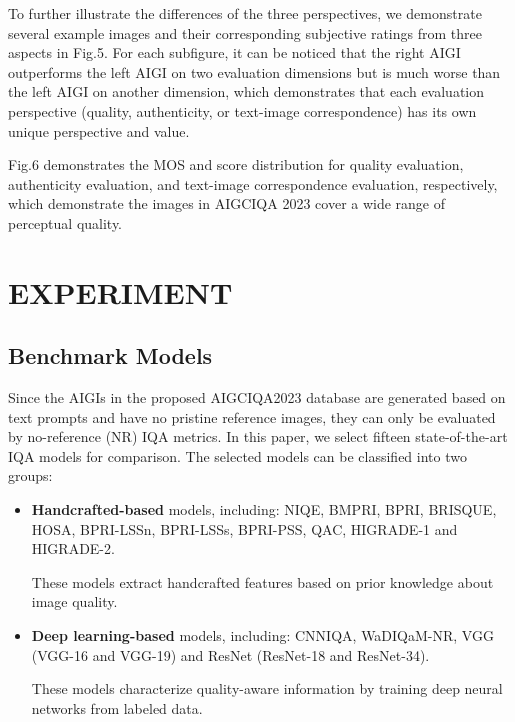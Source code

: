 \documentclass[runningheads]{llncs}
\begin{document}
To further illustrate the differences of the three perspectives, we demonstrate several example images and their corresponding subjective ratings from three aspects in Fig.5.
For each subfigure, it can be noticed that the right AIGI outperforms the left AIGI on two evaluation dimensions but is much worse than the left AIGI on another dimension, which demonstrates that each evaluation perspective (quality, authenticity, or text-image correspondence) has its own unique perspective and value.



Fig.6 demonstrates the MOS and score distribution for quality evaluation, authenticity evaluation, and text-image correspondence evaluation, respectively, which demonstrate the images in AIGCIQA 2023 cover a wide range of perceptual quality. 





\section{EXPERIMENT}
\subsection{Benchmark Models}
Since the AIGIs in the proposed AIGCIQA2023 database are generated based on text prompts and have no pristine reference images, they can only be evaluated by no-reference (NR) IQA metrics.
In this paper, we select fifteen state-of-the-art IQA models for comparison. The selected models can be classified into two groups:


\begin{itemize}
\item \textbf{Handcrafted-based} models, including: NIQE\cite{mittal2012making}, BMPRI\cite{min2018blind}, BPRI\cite{min2017blind}, BRISQUE\cite{mittal2012no}, HOSA\cite{xu2016blind}, BPRI-LSSn\cite{min2017blind}, BPRI-LSSs\cite{min2017blind}, BPRI-PSS\cite{min2017blind}, QAC\cite{xue2013learning}, HIGRADE-1 and HIGRADE-2\cite{kundu2017large}. 

These models extract handcrafted features based on prior knowledge about image quality. 

\item \textbf{Deep learning-based} models, including: CNNIQA\cite{kang2014convolutional}, WaDIQaM-NR\cite{bosse2017deep}, VGG (VGG-16 and VGG-19)\cite{simonyan2014very} and ResNet (ResNet-18 and ResNet-34)\cite{he2016deep}.  

These models characterize quality-aware information by training deep neural networks from labeled data.
\end {itemize}
%
\end{document}
